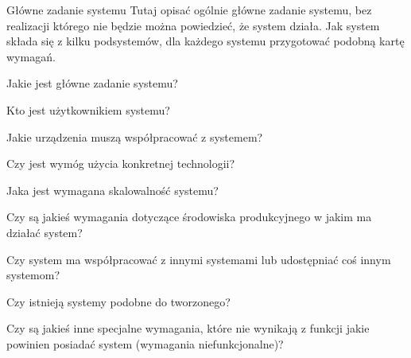 \documentclass[a4paper]{article}
\begin{document}
    \begin{userstory}{Główne zadanie systemu}
        Tutaj opisać ogólnie główne zadanie systemu, bez realizacji którego nie będzie można powiedzieć, że system działa. Jak system składa się z kilku podsystemów, dla każdego systemu przygotować podobną kartę wymagań.
        \begin{questions}
            \item{
                Jakie jest główne zadanie systemu?
            }
            \item{
                Kto jest użytkownikiem systemu?
            }
            \item{
                Jakie urządzenia muszą współpracować z systemem?
            }
            \item{
                Czy jest wymóg użycia konkretnej technologii?
            }
            \item{
                Jaka jest wymagana skalowalność systemu?
            }
            \item{
                Czy są jakieś wymagania dotyczące środowiska produkcyjnego w jakim ma działać system?
            }
            \item{
                Czy system ma współpracować z innymi systemami lub udostępniać coś innym systemom?
            }
            \item{
                Czy istnieją systemy podobne do tworzonego?
            }
            \item{
                Czy są jakieś inne specjalne wymagania, które nie wynikają z funkcji jakie powinien posiadać system (wymagania niefunkcjonalne)?
            }
        \end{questions}
    \end{userstory}
\end{document}
